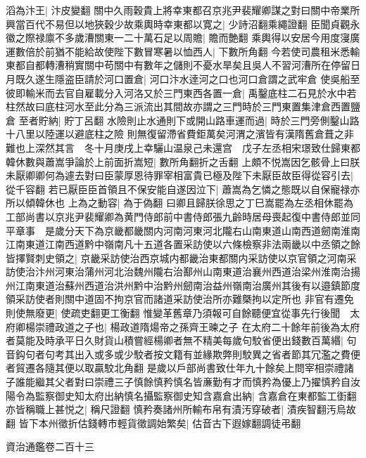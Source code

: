 滔為汴王|{
	汴皮變翻}
關中久雨穀貴上將幸東都召京兆尹裴耀卿謀之對曰關中帝業所興當百代不易但以地狹穀少故乘輿時幸東都以寛之|{
	少詩沼翻乘繩證翻}
臣聞貞觀永徽之際禄廪不多歲漕關東一二十萬石足以周贍|{
	贍而艶翻}
乘輿得以安居今用度寖廣運數倍於前猶不能給故使陛下數冒寒暑以恤西人|{
	下數所角翻}
今若使司農租米悉輸東都自都轉漕稍實關中苟關中有數年之儲則不憂水旱矣且吳人不習河漕所在停留日月既久遂生隱盗臣請於河口置倉|{
	河口汴水逹河之口也河口倉謂之武牢倉}
使吳船至彼即輸米而去官自雇載分入河洛又於三門東西各置一倉|{
	禹鑿底柱二石見於水中若柱然故曰底柱河水至此分為三派流出其間故亦謂之三門時於三門東置集津倉西置鹽倉}
至者貯納|{
	貯丁呂翻}
水險則止水通則下或開山路車運而過|{
	時於三門旁側鑿山路十八里以陸運以避底柱之險}
則無復留滯省費鉅萬矣河渭之濱皆有漢隋舊倉葺之非難也上深然其言　冬十月庚戌上幸驪山温泉己未還宫　戊子左丞相宋璟致仕歸東都　韓休數與蕭嵩爭論於上前面折嵩短|{
	數所角翻折之舌翻}
上頗不悦嵩因乞骸骨上曰朕未厭卿卿何為遽去對曰臣蒙厚恩待罪宰相富貴已極及陛下未厭臣故臣得從容引去|{
	從千容翻}
若已厭臣臣首領且不保安能自遂因泣下|{
	蕭嵩為乞憐之態既以自保寵禄亦所以傾韓休也}
上為之動容|{
	為于偽翻}
曰卿且歸朕徐思之丁巳嵩罷為左丞相休罷為工部尚書以京兆尹裴耀卿為黄門侍郎前中書侍郎張九齡時居母喪起復中書侍郎並同平章事　是歲分天下為京畿都畿關内河南河東河北隴右山南東道山南西道劒南淮南江南東道江南西道黔中嶺南凡十五道各置采訪使以六條檢察非法兩畿以中丞領之餘皆擇賢刺史領之|{
	京畿采訪使治西京城内都畿治東都關内采訪使以京官領之河南采訪使治汴州河東治蒲州河北治魏州隴右治鄯州山南東道治襄州西道治梁州淮南治揚州江南東道治蘇州西道治洪州黔中治黔州劒南治益州嶺南治廣州其後有以邉鎮節度領采訪使者則關中道固不拘京官而諸道采訪使治所亦難槩拘以定所也}
非官有遷免則使無廢更|{
	使疏吏翻更工衡翻}
惟變革舊章乃須報可自餘聽便宜從事先行後聞　太府卿楊崇禮政道之子也|{
	楊政道隋煬帝之孫齊王暕之子}
在太府二十餘年前後為太府者莫能及時承平日久財貨山積嘗經楊卿者無不精美每歲句駮省便出錢數百萬緡|{
	句音鈎句者句考其出入或多或少駮者按文籍有並緣欺弊則駮異之省者節其冗濫之費便者貿遷各隨其便以取贏駮北角翻}
是歲以戶部尚書致仕年九十餘矣上問宰相崇禮諸子誰能繼其父者對曰崇禮三子慎餘慎矜慎名皆亷勤有才而慎矜為優上乃擢慎矜自汝陽令為監察御史知太府出納慎名攝監察御史知含嘉倉出納|{
	含嘉倉在東都監工衘翻}
亦皆稱職上甚悦之|{
	稱尺證翻}
慎矜奏諸州所輸布帛有漬汚穿破者|{
	漬疾智翻汚烏故翻}
皆下本州徵折估錢轉市輕貨徵調始繁矣|{
	估音古下遐嫁翻調徒弔翻}


資治通鑑卷二百十三
